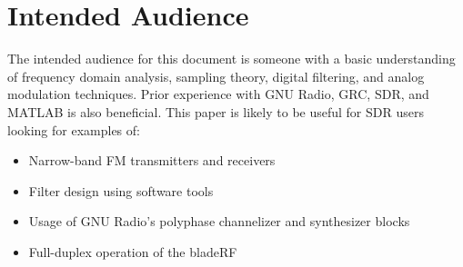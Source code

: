 \def \title{An SDR-based FRS Transceiver}
\def \subtitle{Prototyping a Multi-channel FRS Transceiver with CTCSS Support via GNU Radio and the Nuand bladeRF}

\def \authors{
  \begin{table}[h]
    \centering
    \begin{tabular}{ccc}
      Robert Ghilduta & Brian Padalino & Jon Szymaniak \\
      \href{mailto:robert.ghilduta@nuand.com?cc=bladeRF@nuand.com}{robert.ghilduta@nuand.com} & \href{mailto:bpadalino@nuand.com?cc=bladeRF@nuand.com}{bpadalino@nuand.com} & \href{mailto:jon@nuand.com?cc=bladeRF@nuand.com}{jon@nuand.com}
    \end{tabular}
  \end{table}
  ~\\
}

\def \tablerowcolor{\rowcolor[HTML]{C0C0C0}}
\def \tablecolcolor{\columncolor[HTML]{C0C0C0}}

\def \revisions {
  \begin{table}[h]
    \centering
    \begin{tabular}{|c|c|l|}
      \hline
      \tablerowcolor
      \textbf{Revision} & Date & \textbf{Summary} \hspace{4in}  \\ \hline
      1  & 2015-06-12 & Initial public draft \\ \hline
    \end{tabular}
  \end{table}
}





\whitepapercover
\docinfo

\section{Intended Audience}
The intended audience for this document is someone with a basic understanding
of frequency domain analysis, sampling theory, digital filtering, and analog
modulation techniques. Prior experience with GNU Radio, \ac{GRC}, \ac{SDR}, and
MATLAB is also beneficial. This paper is likely to be useful for SDR users
looking for examples of:
\begin{itemize}
    \item Narrow-band FM transmitters and receivers
    \item Filter design using software tools
    \item Usage of GNU Radio's polyphase channelizer and synthesizer blocks
    \item Full-duplex operation of the bladeRF
\end{itemize}

